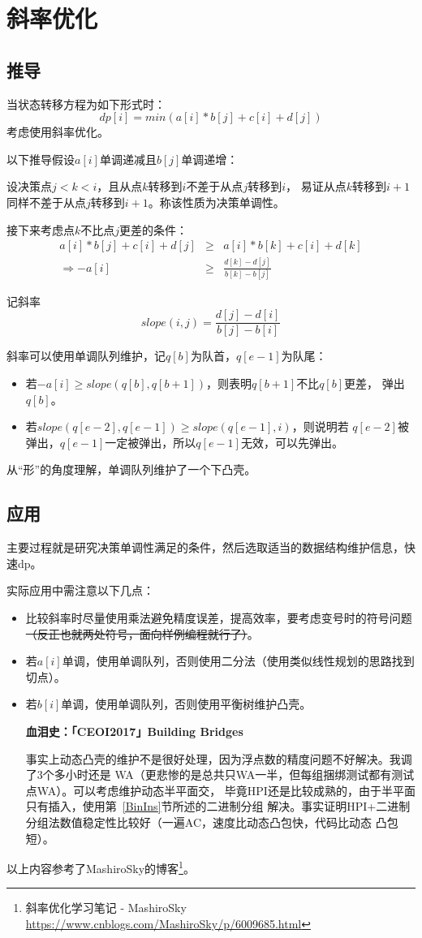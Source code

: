 \section{斜率优化}\label{Slope}
\subsection{推导}
当状态转移方程为如下形式时：
\begin{displaymath}
    dp[i]=min(a[i]*b[j]+c[i]+d[j])
\end{displaymath}
考虑使用斜率优化。

以下推导假设$a[i]$单调递减且$b[j]$单调递增：

设决策点$j<k<i$，且从点$k$转移到$i$不差于从点$j$转移到$i$，
易证从点$k$转移到$i+1$同样不差于从点$j$转移到$i+1$。称该性质为决策单调性。

接下来考虑点$k$不比点$j$更差的条件：
\begin{eqnarray*}
    a[i]*b[j]+c[i]+d[j]&\geq&a[i]*b[k]+c[i]+d[k]\\
    \Rightarrow -a[i]&\geq&\frac{d[k]-d[j]}{b[k]-b[j]}
\end{eqnarray*}

记斜率
\begin{displaymath}
    slope(i,j)=\frac{d[j]-d[i]}{b[j]-b[i]}
\end{displaymath}

斜率可以使用单调队列维护，记$q[b]$为队首，$q[e-1]$为队尾：
\begin{itemize}
    \item 若$-a[i]\geq slope(q[b],q[b+1])$，则表明$q[b+1]$不比$q[b]$更差，
    弹出$q[b]$。
    \item 若$slope(q[e-2],q[e-1])\geq slope(q[e-1],i)$，则说明若
    $q[e-2]$被弹出，$q[e-1]$一定被弹出，所以$q[e-1]$无效，可以先弹出。
\end{itemize}

从``形''的角度理解，单调队列维护了一个下凸壳。
\subsection{应用}
主要过程就是研究决策单调性满足的条件，然后选取适当的数据结构维护信息，快速dp。

实际应用中需注意以下几点：
\begin{itemize}
    \item 比较斜率时尽量使用乘法避免精度误差，提高效率，要考虑变号时的符号问题
    \sout{（反正也就两处符号，面向样例编程就行了）}。
    \item 若$a[i]$单调，使用单调队列，否则使用二分法（使用类似线性规划的思路找到切点）。
    \item 若$b[i]$单调，使用单调队列，否则使用平衡树维护凸壳。

    {\bfseries 血泪史：「CEOI2017」Building Bridges

    事实上动态凸壳的维护不是很好处理，因为浮点数的精度问题不好解决。我调了3个多小时还是
    WA（更悲惨的是总共只WA一半，但每组捆绑测试都有测试点WA）。可以考虑维护动态半平面交，
    毕竟HPI还是比较成熟的，由于半平面只有插入，使用第~\ref{BinIns}节所述的二进制分组
    解决。事实证明HPI+二进制分组法数值稳定性比较好（一遍AC，速度比动态凸包快，代码比动态
    凸包短）。
    }
\end{itemize}

以上内容参考了MashiroSky的博客\footnote{斜率优化学习笔记 - MashiroSky
    \url{https://www.cnblogs.com/MashiroSky/p/6009685.html}
}。
